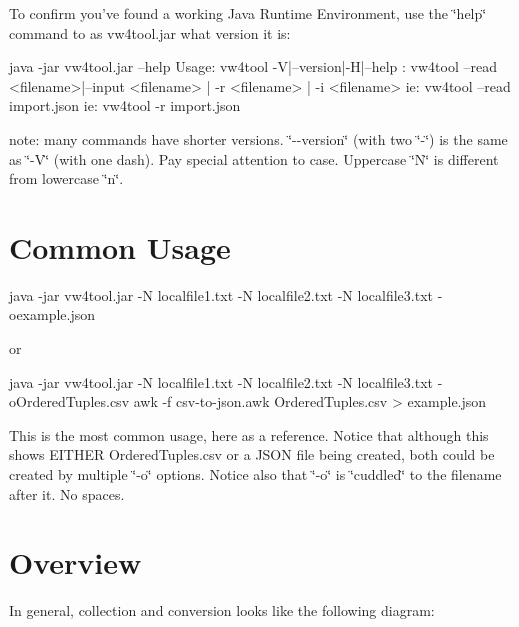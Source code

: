 To confirm you've found a working Java Runtime Environment, use the \char`\"{}help\char`\"{} command to as vw4tool.\+jar what version it is\+: \begin{DoxyVerb}java -jar vw4tool.jar --help
Usage: vw4tool -V|--version|-H|--help
     : vw4tool --read <filename>|--input <filename> | -r <filename> | -i <filename>
   ie: vw4tool --read import.json
   ie: vw4tool -r import.json
\end{DoxyVerb}


note\+: many commands have shorter versions. \char`\"{}-\/-\/version\char`\"{} (with two \char`\"{}-\/\char`\"{}) is the same as \char`\"{}-\/\+V\char`\"{} (with one dash). Pay special attention to case. Uppercase \char`\"{}\+N\char`\"{} is different from lowercase \char`\"{}n\char`\"{}.

\section*{Common Usage }

\begin{DoxyVerb}java -jar vw4tool.jar  -N localfile1.txt -N localfile2.txt -N localfile3.txt -oexample.json
\end{DoxyVerb}


or \begin{DoxyVerb}java -jar vw4tool.jar  -N localfile1.txt -N localfile2.txt -N localfile3.txt -oOrderedTuples.csv
awk -f csv-to-json.awk OrderedTuples.csv > example.json
\end{DoxyVerb}


This is the most common usage, here as a reference. Notice that although this shows E\+I\+T\+H\+E\+R Ordered\+Tuples.\+csv or a J\+S\+O\+N file being created, both could be created by multiple \char`\"{}-\/o\char`\"{} options. Notice also that \char`\"{}-\/o\char`\"{} is \char`\"{}cuddled\char`\"{} to the filename after it. No spaces.

\section*{Overview }

In general, collection and conversion looks like the following diagram\+:

